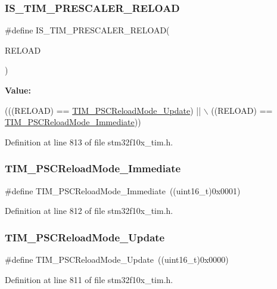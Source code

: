 \subsubsection{\texorpdfstring{I\+S\+\_\+\+T\+I\+M\+\_\+\+P\+R\+E\+S\+C\+A\+L\+E\+R\+\_\+\+R\+E\+L\+O\+AD}{IS\_TIM\_PRESCALER\_RELOAD}}
{\footnotesize\ttfamily \#define I\+S\+\_\+\+T\+I\+M\+\_\+\+P\+R\+E\+S\+C\+A\+L\+E\+R\+\_\+\+R\+E\+L\+O\+AD(\begin{DoxyParamCaption}\item[{}]{R\+E\+L\+O\+AD }\end{DoxyParamCaption})}

{\bfseries Value\+:}
\begin{DoxyCode}
(((RELOAD) == \hyperlink{group___t_i_m___prescaler___reload___mode_gad76dd05a3ae4e44e040e0e083bd460bf}{TIM\_PSCReloadMode\_Update}) || \(\backslash\)
                                         ((RELOAD) == 
      \hyperlink{group___t_i_m___prescaler___reload___mode_ga9ba55481ccdcb64268b7b9f2095bfc17}{TIM\_PSCReloadMode\_Immediate}))
\end{DoxyCode}


Definition at line 813 of file stm32f10x\+\_\+tim.\+h.

\mbox{\label{group___t_i_m___prescaler___reload___mode_ga9ba55481ccdcb64268b7b9f2095bfc17}} 
\subsubsection{\texorpdfstring{T\+I\+M\+\_\+\+P\+S\+C\+Reload\+Mode\+\_\+\+Immediate}{TIM\_PSCReloadMode\_Immediate}}
{\footnotesize\ttfamily \#define T\+I\+M\+\_\+\+P\+S\+C\+Reload\+Mode\+\_\+\+Immediate~((uint16\+\_\+t)0x0001)}



Definition at line 812 of file stm32f10x\+\_\+tim.\+h.

\mbox{\label{group___t_i_m___prescaler___reload___mode_gad76dd05a3ae4e44e040e0e083bd460bf}} 
\subsubsection{\texorpdfstring{T\+I\+M\+\_\+\+P\+S\+C\+Reload\+Mode\+\_\+\+Update}{TIM\_PSCReloadMode\_Update}}
{\footnotesize\ttfamily \#define T\+I\+M\+\_\+\+P\+S\+C\+Reload\+Mode\+\_\+\+Update~((uint16\+\_\+t)0x0000)}



Definition at line 811 of file stm32f10x\+\_\+tim.\+h.

